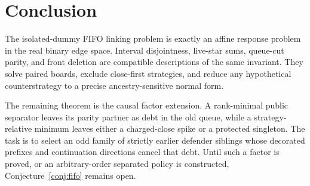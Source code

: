 \documentclass[11pt]{article}
\theoremstyle{definition}
\theoremstyle{remark}
\begin{document}
\section{Conclusion}

The isolated-dummy FIFO linking problem is exactly an affine response problem
in the real binary edge space.  Interval disjointness, live-star sums,
queue-cut parity, and front deletion are compatible descriptions of the same
invariant.  They solve paired boards, exclude close-first strategies, and
reduce any hypothetical counterstrategy to a precise ancestry-sensitive
normal form.

The remaining theorem is the causal factor extension.  A rank-minimal public
separator leaves its parity partner as debt in the old queue, while a
strategy-relative minimum leaves either a charged-close spike or a protected
singleton.  The task is to select an odd family of strictly earlier defender
siblings whose decorated prefixes and continuation directions cancel that
debt.  Until such a factor is proved, or an arbitrary-order separated policy
is constructed, Conjecture~\ref{conj:fifo} remains open.



\end{document}
